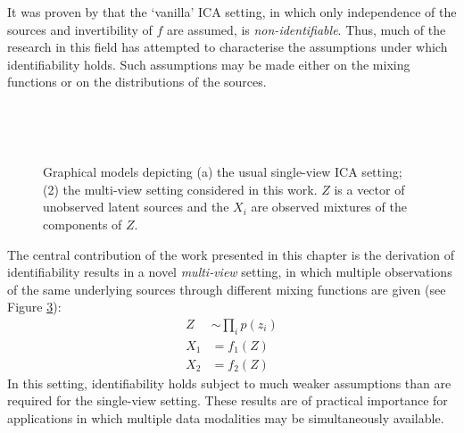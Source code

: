 It was proven by \cite{hyvarinen1999nonlinear} that the `vanilla' ICA setting, in which only independence of the sources and invertibility of $f$ are assumed, is \emph{non-identifiable}.
Thus, much of the research in this field has attempted to characterise the assumptions under which identifiability holds.
Such assumptions may be made either on the mixing functions or on the distributions of the sources. 


\begin{figure}
\center

\end{figure}

\begin{figure}
	\begin{subfigure}{.45\linewidth}
		\center\
		\caption{}\label{fig:ica-model:a}
	\end{subfigure}
	\hfill
	\begin{subfigure}{.45\linewidth}
		\center\
		\caption{}\label{fig:ica-model:b}
	\end{subfigure}
	\caption[Graphical model depictions of ICA and multi-view ICA]{Graphical models depicting (a) the usual single-view ICA setting; (2) the multi-view setting considered in this work. $Z$ is a vector of unobserved latent sources and the $X_i$ are observed mixtures of the components of $Z$.}
\end{figure}


The central contribution of the work presented in this chapter is the derivation of identifiability results in a novel \emph{multi-view} setting, in which multiple observations of the same underlying sources through different mixing functions are given (see Figure \ref{fig:ica-model:b}):
%
\begin{align*}
Z &\sim \prod_i p(z_i) \\
X_1 &= f_1(Z) \\
X_2 &= f_2(Z)
\end{align*}
%
In this setting, identifiability holds subject to much weaker assumptions than are required for the single-view setting.
These results are of practical importance for applications in which multiple data modalities may be simultaneously available.

